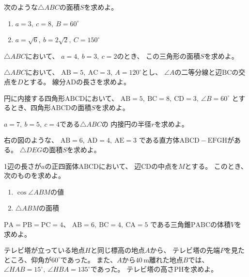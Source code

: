 \documentclass[a4paper, 10pt]{jarticle}
\begin{document}
次のような$\triangle ABC$の面積$S$を求めよ。
\begin{enumerate}
  \item $a=3,\ c=8,\ B=60^\circ$
  \item $a=\sqrt{6},\ b=2\sqrt{2},\ C=150^\circ$
\end{enumerate}

$\triangle ABC$において、
$a=4,\ b=3,\ c=2$のとき、
この三角形の面積$S$を求めよ。

$\triangle ABC$において、
$\mathrm{AB}=5,\ \mathrm{AC}=3,\ A=120^\circ$とし、
$\angle A$の二等分線と辺$\mathrm{BC}$の交点を$D$とする。
線分$\mathrm{AD}$の長さを求めよ。

円に内接する四角形$\mathrm{ABCD}$において、
$\mathrm{AB}=5,\ \mathrm{BC}=8,\ \mathrm{CD}=3,\ \angle B=60^\circ$
とするとき、四角形$\mathrm{ABCD}$の面積$S$を求めよ。

$a=7,\ b=5,\ c=4$である$\triangle ABC$の
内接円の半径$r$を求めよ。

右の図のような、
$\mathrm{AB}=6,\ \mathrm{AD}=4,\ \mathrm{AE}=3$
である直方体$\mathrm{ABCD-EFGH}$がある。
$\triangle DEG$の面積$S$を求めよ。

1辺の長さが$a$の正四面体$\mathrm{ABCD}$において、
辺$\mathrm{CD}$の中点を$M$とする。
このとき、次のものを求めよ。
\begin{enumerate}
  \item $\cos\angle ABM$の値
  \item $\triangle ABM$の面積
\end{enumerate}

$\mathrm{PA}=\mathrm{PB}=\mathrm{PC}=4$、
$\mathrm{AB}=6,\ \mathrm{BC}=4,\ \mathrm{CA}=5$
である三角錐$\mathrm{PABC}$の体積$V$を求めよ。

テレビ塔が立っている地点$H$と同じ標高の地点$A$から、
テレビ塔の先端$P$を見たところ、仰角が$60^\circ$であった。
また、$A$から$40\,\mathrm{m}$離れた地点$B$では、
$\angle HAB=15^\circ,\ \angle HBA=135^\circ$であった。
テレビ塔の高さ$\mathrm{PH}$を求めよ。
\end{document}
